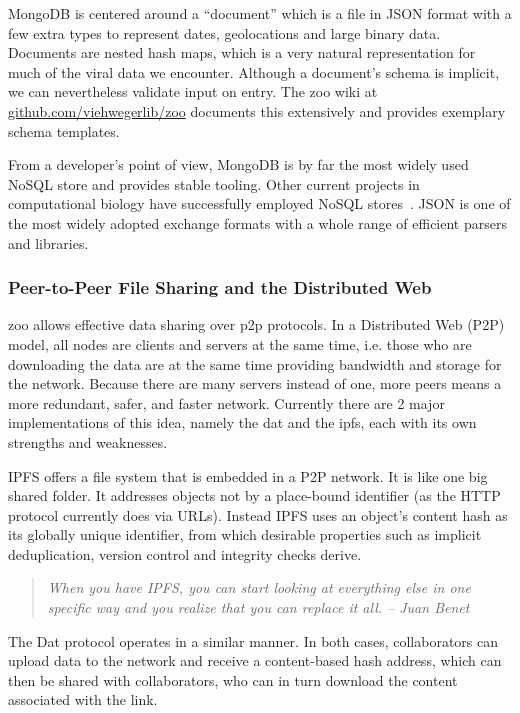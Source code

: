 MongoDB is centered around a ``document'' which is a file in JSON format with a few extra types to represent dates, geolocations and large binary data. Documents are nested hash maps, which is a very natural representation for much of the viral data we encounter. Although a document's schema is implicit, we can nevertheless validate input on entry. The zoo wiki at \hyperlink{https://github.com/viehwegerlib/zoo}{github.com/viehwegerlib/zoo} documents this extensively and provides exemplary schema templates.

From a developer's point of view, MongoDB is by far the most widely used NoSQL store and provides stable tooling. Other current projects in computational biology have successfully employed NoSQL stores~\cite{Neher2015-vn}. JSON is one of the most widely adopted exchange formats with a whole range of efficient parsers and libraries.


\subsubsection{Peer-to-Peer File Sharing and the Distributed Web}

zoo allows effective data sharing over \gls{p2p} protocols. In a Distributed Web (P2P) model, all nodes are clients and servers at the same time, i.e. those who are downloading the data are at the same time providing bandwidth and storage for the network. Because there are many servers instead of one, more peers means a more redundant, safer, and faster network. Currently there are 2 major implementations of this idea, namely the \gls{dat} and the \gls{ipfs}, each with its own strengths and weaknesses.

IPFS offers a file system that is embedded in a P2P network. It is like one big shared folder. It addresses objects not by a place-bound identifier (as the HTTP protocol currently does via URLs). Instead IPFS uses an object's content hash as its globally unique identifier, from which desirable properties such as implicit deduplication, version control and integrity checks derive.


\begin{quotation}
    \emph{When you have IPFS, you can start looking at everything else in one specific way and you realize that you can replace it all. -- Juan Benet}
\end{quotation}


The Dat protocol operates in a similar manner. In both cases, collaborators can upload data to the network and receive a content-based hash address, which can then be shared with collaborators, who can in turn download the content associated with the link.

